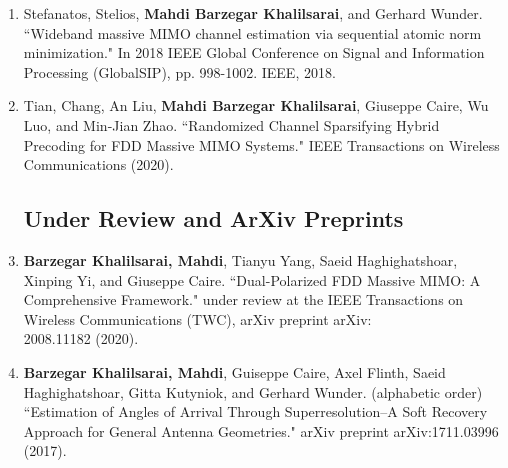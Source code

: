 \documentclass[a4paper,10pt]{article}
\begin{document}
\begin{enumerate}
	\item Stefanatos, Stelios, \textbf{Mahdi Barzegar Khalilsarai}, and Gerhard Wunder. ``Wideband massive MIMO channel estimation via sequential atomic norm minimization." In 2018 IEEE Global Conference on Signal and Information Processing (GlobalSIP), pp. 998-1002. IEEE, 2018.
	
	\item Tian, Chang, An Liu, \textbf{Mahdi Barzegar Khalilsarai}, Giuseppe Caire, Wu Luo, and Min-Jian Zhao. ``Randomized Channel Sparsifying Hybrid Precoding for FDD Massive MIMO Systems." IEEE Transactions on Wireless Communications (2020).
	\noindent\subsection*{Under Review and ArXiv Preprints}
	\item  \textbf{Barzegar Khalilsarai, Mahdi}, Tianyu Yang, Saeid Haghighatshoar, Xinping Yi, and Giuseppe Caire. ``Dual-Polarized FDD Massive MIMO: A Comprehensive Framework." under review at the IEEE Transactions on Wireless Communications (TWC), arXiv preprint arXiv:\\2008.11182 (2020).
	
	\item \textbf{Barzegar Khalilsarai, Mahdi}, Guiseppe Caire, Axel Flinth, Saeid Haghighatshoar, Gitta Kutyniok, and Gerhard Wunder. (alphabetic order) ``Estimation of Angles of Arrival Through Superresolution--A Soft Recovery Approach for General Antenna Geometries." arXiv preprint arXiv:1711.03996 (2017).
	
%	
\end{enumerate}
\end{document}
